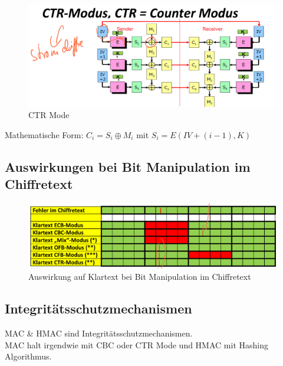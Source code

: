 \documentclass[12pt]{scrartcl}
\begin{document}
\begin{figure}[ht]
    \centering
    \includegraphics[width=\textwidth]{img/ctr_mode.png}
    \caption{CTR Mode}
    \label{fig:ctr_mode}
\end{figure}


Mathematische Form: $C_i = S_i \oplus M_i$ mit $S_i = E(IV + (i - 1),K)$


\subsection{Auswirkungen bei Bit Manipulation im Chiffretext}


\begin{figure}[ht]
    \centering
    \includegraphics[width=\textwidth]{img/klartext_fehler_nach_manipulation.png}
    \caption{Auswirkung auf Klartext bei Bit Manipulation im Chiffretext}
    \label{fig:auswirkungen_manipulation}
\end{figure}


\subsection{Integritätsschutzmechanismen}


MAC \& HMAC sind Integritätsschutzmechanismen.\\

MAC halt irgendwie mit CBC oder CTR Mode und HMAC mit Hashing Algorithmus.\\
\end{document}
